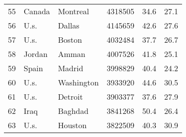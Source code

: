 \begin{center}
\begin{longtable}{clllcc}
        55                                       & Canada                               & Montreal                          & 4318505                                 & 34.6                                  & 27.1                                  \\
        56                                       & U.s.                                 & Dallas                            & 4145659                                 & 42.6                                  & 27.6                                  \\
        57                                       & U.s.                                 & Boston                            & 4032484                                 & 37.7                                  & 26.7                                  \\
        58                                       & Jordan                               & Amman                             & 4007526                                 & 41.8                                  & 25.1                                  \\
        59                                       & Spain                                & Madrid                            & 3998829                                 & 40.4                                  & 24.2                                  \\
        60                                       & U.s.                                 & Washington                        & 3933920                                 & 44.6                                  & 30.5                                  \\
        61                                       & U.s.                                 & Detroit                           & 3903377                                 & 37.6                                  & 27.9                                  \\
        62                                       & Iraq                                 & Baghdad                           & 3841268                                 & 50.4                                  & 26.4                                  \\
        63                                       & U.s.                                 & Houston                           & 3822509                                 & 40.3                                  & 30.9                                  \\

\end{longtable}
\end{center}
